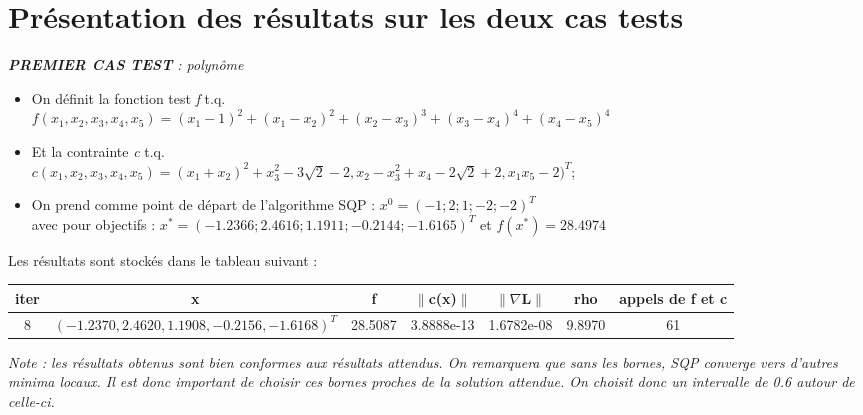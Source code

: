 \section{Présentation des résultats sur les deux cas tests}

\begin{center} \emph{\textbf{PREMIER CAS TEST} : polynôme}\\\end{center}

\renewcommand{\labelitemi}{\textbullet}
\begin{itemize}
\item On définit la fonction test \textit{f} t.q.\\
$f(x_1,x_2,x_3,x_4,x_5) = (x_1-1)^2+(x_1-x_2)^2 + (x_2 - x_3)^3 + (x_3 - x_4)^4 + (x_4 - x_5)^4$\\
\item Et la contrainte \textit{c} t.q.\\
$c(x_1,x_2,x_3,x_4,x_5) =
(x_1 + x_2)^2 + x_3^2 - 3\sqrt{2} - 2 , 
x_2 - x_3^2 + x_4 - 2\sqrt{2} + 2 , 
x_{1}x_{5} - 2)^{T}$;\bigbreak
\end{itemize}

\begin{itemize}
\item On prend comme point de départ de l'algorithme SQP : $x^0 = (-1 ; 2 ; 1 ; -2 ; -2)^{T}$\\
\indent avec pour objectifs : $x^{*} = (-1.2366 ; 2.4616 ; 1.1911 ; -0.2144 ; -1.6165)^{T}$ et $f(x^{*}) = 28.4974$\\
\end{itemize}
Les résultats sont stockés dans le tableau suivant : \smallbreak
{\renewcommand{\arraystretch}{1.5}
\begin{tabular}{|c|c|c|c|c|c|c|}
	\hline
 	iter & x & f & $\| $c(x)$ \|$ & $\|    \nabla $L$  \|$ & rho & appels de f et c\\
	\hline
 	8 & $(-1.2370, 2.4620, 1.1908, -0.2156, -1.6168)^{T}$ & 28.5087 & 3.8888e-13 & 1.6782e-08 & 9.8970 & 61\\
	\hline
\end{tabular}
}
\bigbreak
\textit{Note : les résultats obtenus sont bien conformes aux résultats attendus. On remarquera que sans les bornes, SQP converge vers d'autres minima locaux. Il est donc important de choisir ces bornes proches de la solution attendue. On choisit donc un intervalle de 0.6
autour de celle-ci.}
\medbreak





